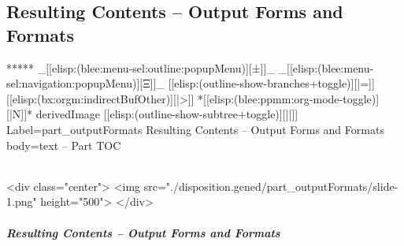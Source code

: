 \begin{whenOrg}
\newpage
\part{Resulting Contents -- Output Forms and Formats}


\begin{whenOrg}
*****  _[[elisp:(blee:menu-sel:outline:popupMenu)][±]]_ _[[elisp:(blee:menu-sel:navigation:popupMenu)][Ξ]]_ [[elisp:(outline-show-branches+toggle)][|=]] [[elisp:(bx:orgm:indirectBufOther)][|>]] *[[elisp:(blee:ppmm:org-mode-toggle)][|N]]*  derivedImage [[elisp:(outline-show-subtree+toggle)][||]] Label=part_outputFormats Resulting Contents -- Output Forms and Formats body=text -- Part TOC
\end{whenOrg}

\begin{htmlonly}

\begin{frame}[fragile,plain,label=part_outputFormats]
    \frametitle{}
    \framesubtitle{}
    \begin{rawhtml}
<div class="center">
<img src="./disposition.gened/part_outputFormats/slide-1.png" height="500">
</div>
    \end{rawhtml}
\end{frame}
\end{htmlonly}

\begin{verblatex}

\begin{frame}[fragile,label=part_outputFormats]
    \frametitle{Resulting Contents -- Output Forms and Formats}
    \framesubtitle{}

    \tableofcontents



\end{frame}
\end{verblatex}
\end{whenOrg}
